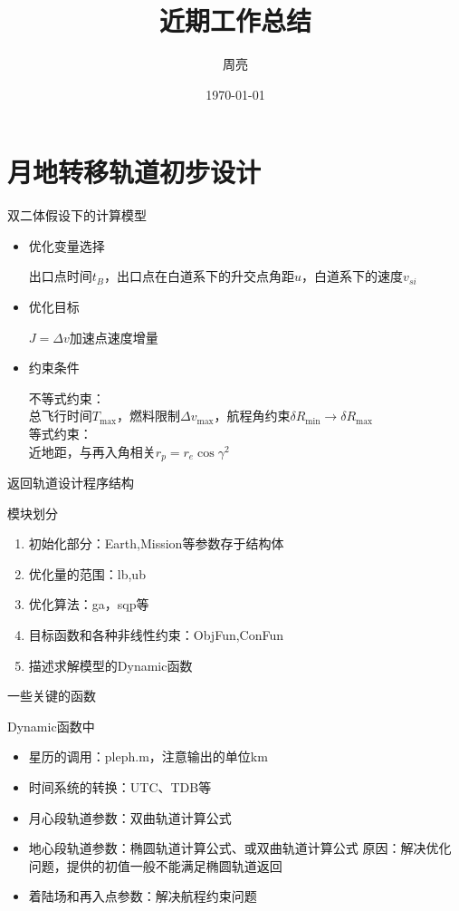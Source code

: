 \documentclass[11pt]{ctexbeamer}
\author{周亮}
\title{近期工作总结}
\institute{102教研室}
\date{\today}
\begin{document}
\begin{frame}
	\titlepage
\end{frame}

\begin{frame}
	\tableofcontents
\end{frame}

\section{月地转移轨道初步设计}
\begin{frame}{双二体假设下的计算模型}
	\begin{itemize}
		\item 优化变量选择\par
		      出口点时间$ t_B $，出口点在白道系下的升交点角距$ u $，白道系下的速度$ v_{si} $
		\item 优化目标\par
		      $ J=\Delta v $加速点速度增量
		\item 约束条件\par
		      不等式约束：\\总飞行时间$ T_{\max} $，燃料限制$\Delta v_{\max}  $，航程角约束$ \delta R_{\min}\to  \delta R_{\max}$\\
		      等式约束：\\近地距，与再入角相关$ r_p=r_e\cos \gamma^2 $
	\end{itemize}
\end{frame}

\begin{frame}{返回轨道设计程序结构}
	\begin{block}{模块划分}
		\begin{enumerate}
			\item 初始化部分：Earth,Mission等参数存于结构体
			\item 优化量的范围：lb,ub
			\item 优化算法：ga，sqp等
			\item 目标函数和各种非线性约束：ObjFun,ConFun
			\item 描述求解模型的Dynamic函数
		\end{enumerate}
	\end{block}
\end{frame}

\begin{frame}{一些关键的函数}
	\begin{block}{Dynamic函数中}
		\begin{itemize}
			\item 星历的调用：pleph.m，注意输出的单位km
			\item 时间系统的转换：UTC、TDB等
			\item 月心段轨道参数：双曲轨道计算公式
			\item 地心段轨道参数：椭圆轨道计算公式、或双曲轨道计算公式
			原因：解决优化问题，提供的初值一般不能满足椭圆轨道返回
			\item 着陆场和再入点参数：解决航程约束问题
		\end{itemize}
	\end{block}
\end{frame}
\end{document}
